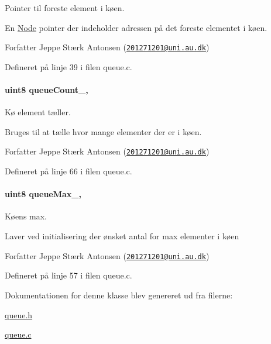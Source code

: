 Pointer til foreste element i køen. 

En \hyperlink{queue_8c_db/d8b/struct_node}{Node} pointer der indeholder adressen på det foreste elementet i køen.

\begin{DoxyAuthor}{Forfatter}
Jeppe Stærk Antonsen (\href{mailto:201271201@uni.au.dk}{\tt 201271201@uni.\+au.\+dk}) 
\end{DoxyAuthor}


Defineret på linje 39 i filen queue.\+c.

\paragraph[{\texorpdfstring{queue\+Count\+\_\+}{queueCount_}}]{\setlength{\rightskip}{0pt plus 5cm}uint8 queue\+Count\+\_\+\hspace{0.3cm}{\ttfamily [static]}, {\ttfamily [private]}}\hypertarget{class_queue_ad260f9ccca00e80d161bbf3e70c3ffa6}{}\label{class_queue_ad260f9ccca00e80d161bbf3e70c3ffa6}


Kø element tæller. 

Bruges til at tælle hvor mange elementer der er i køen.

\begin{DoxyAuthor}{Forfatter}
Jeppe Stærk Antonsen (\href{mailto:201271201@uni.au.dk}{\tt 201271201@uni.\+au.\+dk}) 
\end{DoxyAuthor}


Defineret på linje 66 i filen queue.\+c.

\paragraph[{\texorpdfstring{queue\+Max\+\_\+}{queueMax_}}]{\setlength{\rightskip}{0pt plus 5cm}uint8 queue\+Max\+\_\+\hspace{0.3cm}{\ttfamily [static]}, {\ttfamily [private]}}\hypertarget{class_queue_acb6b6e88c9e4d12839594b31e6ff7c5a}{}\label{class_queue_acb6b6e88c9e4d12839594b31e6ff7c5a}


Køens max. 

Laver ved initialisering der ønsket antal for max elementer i køen

\begin{DoxyAuthor}{Forfatter}
Jeppe Stærk Antonsen (\href{mailto:201271201@uni.au.dk}{\tt 201271201@uni.\+au.\+dk}) 
\end{DoxyAuthor}


Defineret på linje 57 i filen queue.\+c.



Dokumentationen for denne klasse blev genereret ud fra filerne\+:\begin{DoxyCompactItemize}
\item 
\hyperlink{queue_8h}{queue.\+h}\item 
\hyperlink{queue_8c}{queue.\+c}\end{DoxyCompactItemize}
